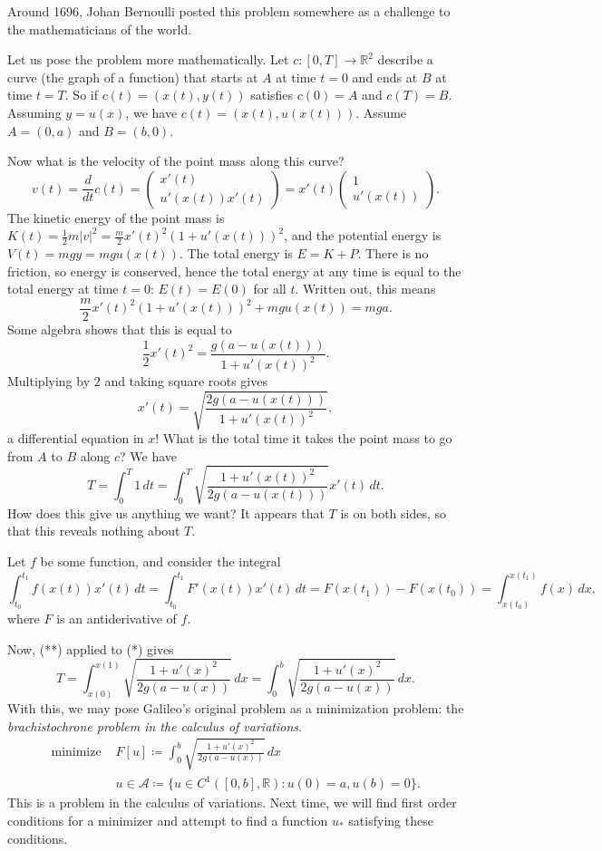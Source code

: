 \documentclass[11pt]{book}
\newcommand{\R}{\mathbb{R}}
\begin{document}
Around 1696, Johan Bernoulli posted this problem somewhere as a challenge to the mathematicians of the world.

Let us pose the problem more mathematically. Let $c : [0, T] \to \R^2$ describe a curve (the graph of a function) that starts at $A$ at time $t = 0$ and ends at $B$ at time $t = T$. So if $c(t) = (x(t), y(t))$ satisfies $c(0) = A$ and $c(T) = B$. Assuming $y = u(x)$, we have $c(t) = (x(t), u(x(t)))$. Assume $A = (0, a)$ and $B = (b, 0)$.

Now what is the velocity of the point mass along this curve?
\[
v(t) = \frac{d}{dt} c(t) = \begin{pmatrix}
x'(t) \\ u'(x(t))x'(t)
\end{pmatrix} = x'(t) \begin{pmatrix}
1 \\ u'(x(t))
\end{pmatrix}.
\]
The kinetic energy of the point mass is $K(t) = \frac{1}{2} m|v|^2 = \frac{m}{2}x'(t)^2 (1 + u'(x(t)))^2$, and the potential energy is $V(t) = mgy = mgu(x(t))$. The total energy is $E = K + P$. There is no friction, so energy is conserved, hence the total energy at any time is equal to the total energy at time $t = 0$: $E(t) = E(0)$ for all $t$. Written out, this means
\[
\frac{m}{2}x'(t)^2(1 + u'(x(t)))^2 + mgu(x(t)) = mga.
\]
Some algebra shows that this is equal to
\[
\frac{1}{2}x'(t)^2 = \frac{g(a - u(x(t)))}{1 + u'(x(t))^2}.
\]
Multiplying by $2$ and taking square roots gives
\[
x'(t) = \sqrt{\frac{2g(a - u(x(t)))}{1 + u'(x(t))^2}},
\]
a differential equation in $x$! What is the total time it takes the point mass to go from $A$ to $B$ along $c$? We have
\[
\tag{*}
T = \int_0^T 1 \, dt = \int_0^T \sqrt{\frac{1 + u'(x(t))^2}{2g(a - u(x(t)))}}x'(t) \, dt.
\]
How does this give us anything we want? It appears that $T$ is on both sides, so that this reveals nothing about $T$.

Let $f$ be some function, and consider the integral
\[
\tag{**}
\int_{t_0}^{t_1} f(x(t))x'(t) \, dt = \int_{t_0}^{t_1} F'(x(t))x'(t) \, dt = F(x(t_1)) - F(x(t_0)) = \int_{x(t_0)}^{x(t_1)} f(x) \, dx,
\]
where $F$ is an antiderivative of $f$. 

Now, (**) applied to (*) gives
\[
T = \int_{x(0)}^{x(1)} \sqrt{\frac{1 + u'(x)^2}{2g(a - u(x))}} \, dx =  \int_{0}^{b} \sqrt{\frac{1 + u'(x)^2}{2g(a - u(x))}} \, dx.
\]
With this, we may pose Galileo's original problem as a minimization problem: the \emph{brachistochrone problem in the calculus of variations}.
\begin{align*}
\text{minimize } &F[u] \coloneqq \int_{0}^{b} \sqrt{\frac{1 + u'(x)^2}{2g(a - u(x))}} \, dx \\
& u \in \mathcal{A} \coloneqq \{ u \in C^1([0,b], \R) : u(0) = a, u(b) = 0 \}.
\end{align*}
This is a problem in the calculus of variations. Next time, we will find first order conditions for a minimizer and attempt to find a function $u_*$ satisfying these conditions.
\end{document}
